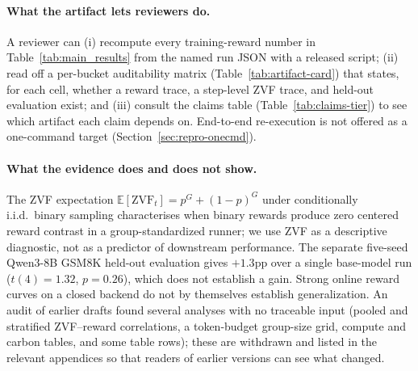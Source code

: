 \paragraph{What the artifact lets reviewers do.}
A reviewer can (i) recompute every training-reward number in
Table~\ref{tab:main_results} from the named run JSON with a released script;
(ii) read off a per-bucket auditability matrix
(Table~\ref{tab:artifact-card}) that states, for each cell, whether a
reward trace, a step-level ZVF trace, and held-out evaluation exist; and
(iii) consult the claims table (Table~\ref{tab:claims-tier}) to see which
artifact each claim depends on. End-to-end re-execution is not offered as a
one-command target (Section~\ref{sec:repro-onecmd}).

\paragraph{What the evidence does and does not show.}
The ZVF expectation $\mathbb E[\mathrm{ZVF}_t]=p^{G}+(1{-}p)^{G}$ under
conditionally i.i.d.\ binary sampling characterises when binary rewards
produce zero centered reward contrast in a group-standardized runner; we use
ZVF as a descriptive diagnostic, not as a predictor of downstream
performance. The separate five-seed Qwen3-8B GSM8K held-out evaluation gives
$+1.3$pp over a single base-model run ($t(4){=}1.32$, $p{=}0.26$), which
does not establish a gain. Strong online reward curves on a closed backend
do not by themselves establish generalization. An audit of earlier drafts
found several analyses with no traceable input (pooled and stratified
ZVF--reward correlations, a token-budget group-size grid, compute and carbon
tables, and some table rows); these are withdrawn and listed in the
relevant appendices so that readers of earlier versions can see what
changed.
